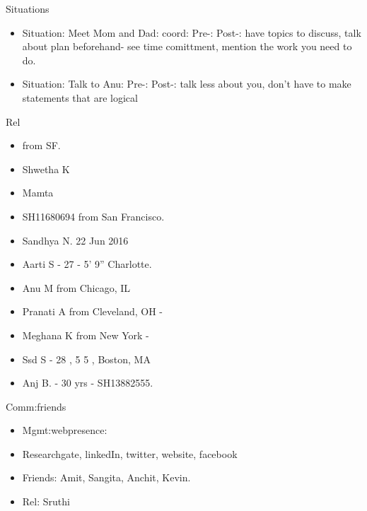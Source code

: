 \documentclass[serif, mathserif, final]{beamer}
\begin{document}
\begin{frame}
\begin{columns}
\begin{column}{0.25\linewidth}
      \begin{block}{Situations}

        \begin{itemize}
          \tiny \item \tiny Situation: Meet Mom and Dad:  coord:
          Pre-:  Post-: have topics to discuss, talk about plan
          beforehand- see time comittment, mention the work you need to do.          
        \item \tiny Situation: Talk to Anu:  Pre-:   Post-:  talk less
          about you, don't have to make statements that are logical 
 
        \end{itemize} 
      \end{block}

\begin{block}{Rel} 
  \begin{itemize} 
    \small \item \small  from SF. 
    \item \small Shwetha K 
    \item \small Mamta       
    \item \small SH11680694 from San Francisco. 
    \item \small Sandhya N. 22 Jun 2016 
    \item \small Aarti S - 27 - 5' 9'' Charlotte.       
    \item \small Anu M from Chicago, IL 
    \item \small Pranati A from Cleveland, OH - 
    \item \small Meghana K from New York - 
    \item \small Ssd S - 28 , 5 5 , Boston, MA 
    \item \small Anj B. - 30 yrs - SH13882555.
  \end{itemize}
\end{block} 


\begin{block}{Comm:friends} 
\begin{itemize}
\item Mgmt:webpresence: 
\item Researchgate, linkedIn, twitter, website, facebook 
\item Friends: Amit, Sangita, Anchit, Kevin. 
\item Rel: Sruthi 
\end{itemize} 
\end{block}
\end{column}%
      

\end{columns}
\end{frame}
\end{document}
